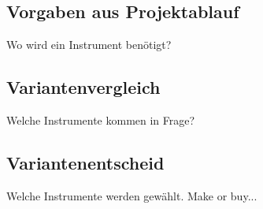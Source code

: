 \subsection{Vorgaben aus Projektablauf}
Wo wird ein Instrument benötigt?

\subsection{Variantenvergleich}
Welche Instrumente kommen in Frage?

\subsection{Variantenentscheid}
Welche Instrumente werden gewählt. Make or buy...